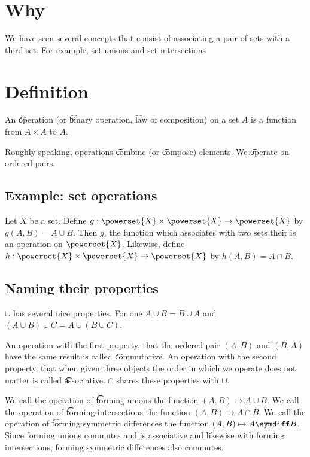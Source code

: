 
\section*{Why}

We have seen several concepts that consist of associating a pair of sets with a third set.
For example, set unions and set intersections

\section*{Definition}

An \t{operation} (or \t{binary operation}, \t{law of composition}) on a set $A$ is a function from $A \times  A$ to $A$.

Roughly speaking, operations \t{combine} (or \t{compose}) elements.
We \t{operate} on ordered pairs.

\subsection*{Example: set operations}

Let $X$ be a set.
Define $g: \powerset{X} \times  \powerset{X} \to \powerset{X}$ by $g(A, B) = A \cup B$.
Then $g$, the function which associates with two sets their is an operation on $\powerset{X}$.
Likewise, define $h : \powerset{X} \times  \powerset{X} \to \powerset{X}$ by $h(A, B) = A \cap  B$.

\subsection*{Naming their properties}

$\cup$ has several nice properties.
For one $A \cup B = B \cup A$ and $(A \cup B) \cup C = A \cup (B \cup C)$.

An operation with the first property, that the ordered pair $(A, B)$ and $(B, A)$ have the same result is called \t{commutative}.
An operation with the second property, that when given three objects the order in which we operate does not matter is called \t{associative}.
$\cap $ shares these properties with $\cup$.

We call the operation of \t{forming unions} the function $(A, B) \mapsto A \cup B$.
We call the operation of \t{forming intersections} the function $(A, B) \mapsto A \cap  B$.
We call the operation of \t{forming symmetric differences} the function $(A, B) \mapsto A \symdiff B$.
Since forming unions commutes and is associative and likewise with forming intersections, forming symmetric differences also commutes.


